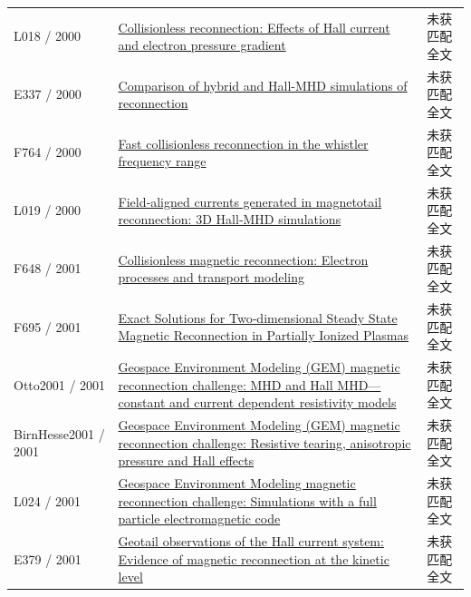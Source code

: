 \begin{longtable}{P{24mm}P{97mm}P{27mm}}
L018 / 2000 & \href{https://doi.org/10.1029/1999ja000357}{Collisionless reconnection: Effects of Hall current and electron pressure gradient} & 未获匹配全文\\

E337 / 2000 & \href{http://ui.adsabs.harvard.edu/abs/2000APS..DPPNP1059Y/abstract}{Comparison of hybrid and Hall-MHD simulations of reconnection} & 未获匹配全文\\

F764 / 2000 & \href{https://doi.org/10.1063/1.874076}{Fast collisionless reconnection in the whistler frequency range} & 未获匹配全文\\

L019 / 2000 & \href{https://doi.org/10.1029/1999gl003688}{Field‐aligned currents generated in magnetotail reconnection: 3D Hall‐MHD simulations} & 未获匹配全文\\

F648 / 2001 & \href{https://doi.org/10.1029/1999ja001002}{Collisionless magnetic reconnection: Electron processes and transport modeling} & 未获匹配全文\\

F695 / 2001 & \href{https://doi.org/10.1086/319012}{Exact Solutions for Two‐dimensional Steady State Magnetic Reconnection in Partially Ionized Plasmas} & 未获匹配全文\\

Otto2001 / 2001 & \href{https://doi.org/10.1029/1999ja001005}{Geospace Environment Modeling (GEM) magnetic reconnection challenge: MHD and Hall MHD—constant and current dependent resistivity models} & 未获匹配全文\\

BirnHesse2001 / 2001 & \href{https://doi.org/10.1029/1999ja001001}{Geospace Environment Modeling (GEM) magnetic reconnection challenge: Resistive tearing,  anisotropic pressure and Hall effects} & 未获匹配全文\\

L024 / 2001 & \href{https://doi.org/10.1029/1999ja001006}{Geospace Environment Modeling magnetic reconnection challenge: Simulations with a full particle electromagnetic code} & 未获匹配全文\\

E379 / 2001 & \href{http://t2r2.star.titech.ac.jp/cgi-bin/publicationinfo.cgi?q_publication_content_number=CTT100469369}{Geotail observations of the Hall current system: Evidence of magnetic reconnection at the kinetic level} & 未获匹配全文\\


\end{longtable}
